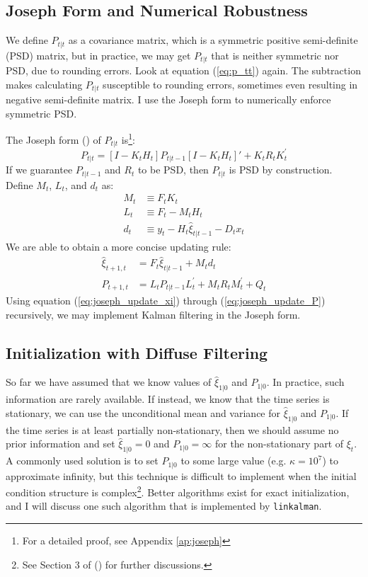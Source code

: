 \documentclass[10pt]{article}
\numberwithin{equation}{section}
\begin{document}
\subsection{Joseph Form and Numerical Robustness}
We define $P_{t|t}$ as a covariance matrix, which is a symmetric positive semi-definite (PSD) matrix, but in practice, we may get $P_{t|t}$ that is neither symmetric nor PSD, due to rounding errors. Look at equation (\ref{eq:p_tt}) again. The subtraction makes calculating $P_{t|t}$ susceptible to rounding errors, sometimes even resulting in negative semi-definite matrix. I use the Joseph form to numerically enforce symmetric PSD. 

The Joseph form (\cite{joseph_1968}) of $P_{t|t}$ is\footnote{For a detailed proof, see Appendix \ref{ap:joseph}}:
\[
    P_{t|t} = [I - K_tH_t]P_{t|t-1}[I - K_tH_t]' + K_tR_tK_t^{'}    
\]
If we guarantee $P_{t|t-1}$ and $R_t$ to be PSD, then $P_{t|t}$ is PSD by construction. Define $M_t$, $L_t$, and $d_t$ as:
\begin{align*}
    M_t &\equiv F_tK_t \\
    L_t &\equiv F_t-M_tH_t \\
    d_t &\equiv y_t - H_t\hat{\xi}_{t|t-1} - D_tx_t
\end{align*}
We are able to obtain a more concise updating rule:
\begin{align}
    \hat{\xi}_{t+1,t} &= F_t\hat{\xi}_{t|t-1} + M_td_t \label{eq:joseph_update_xi} \\
    P_{t+1,t} &= L_tP_{t|t-1}L_t^{'} + M_tR_tM_t^{'} + Q_t \label{eq:joseph_update_P}
\end{align}
Using equation (\ref{eq:joseph_update_xi}) through (\ref{eq:joseph_update_P}) recursively, we may implement Kalman filtering in the Joseph form. 

\subsection{Initialization with Diffuse Filtering} \label{subsec:diff_filter}
So far we have assumed that we know values of $\hat{\xi}_{1|0}$ and $P_{1|0}$. In practice, such information are rarely available. If instead, we know that the time series is stationary, we can use the unconditional mean and variance for $\hat{\xi}_{1|0}$ and $P_{1|0}$. If the time series is at least partially non-stationary, then we should assume no prior information and set $\hat{\xi}_{1|0}=0$ and $P_{1|0}=\infty$ for the non-stationary part of $\xi_t$. A commonly used solution is to set $P_{1|0}$ to some large value (e.g. $\kappa=10^7$) to approximate infinity, but this technique is difficult to implement when the initial condition structure is complex\footnote{See Section 3 of (\cite{doan_2010}) for further discussions.}. Better algorithms exist for exact initialization, and I will discuss one such algorithm that is implemented by \texttt{linkalman}.
\end{document}
